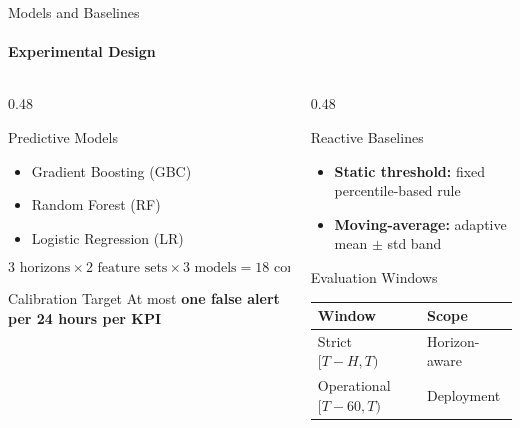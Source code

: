 \documentclass[aspectratio=169,11pt]{beamer}
\begin{document}
\begin{frame}{Models and Baselines}
\framesubtitle{Experimental Design}

\begin{columns}[T]
\begin{column}{0.48\textwidth}
\begin{block}{Predictive Models}
\begin{itemize}
    \item Gradient Boosting (GBC)
    \item Random Forest (RF)
    \item Logistic Regression (LR)
\end{itemize}
\end{block}

\vspace{0.4em}
{\small
\[
3 \text{ horizons} \times 2 \text{ feature sets} \times 3 \text{ models} = 18 \text{ configs}
\]
}

\begin{alertblock}{Calibration Target}
At most \textbf{one false alert per 24 hours per KPI}
\end{alertblock}
\end{column}

\begin{column}{0.48\textwidth}
\begin{block}{Reactive Baselines}
\begin{itemize}
    \item \textbf{Static threshold:} fixed percentile-based rule
    \item \textbf{Moving-average:} adaptive mean $\pm$ std band
\end{itemize}
\end{block}

\vspace{0.4em}
\begin{block}{Evaluation Windows}
{\small
\begin{tabular}{ll}
\toprule
\textbf{Window} & \textbf{Scope} \\
\midrule
Strict $[T{-}H, T)$ & Horizon-aware \\
Operational $[T{-}60, T)$ & Deployment \\
\bottomrule
\end{tabular}
}
\end{block}
\end{column}
\end{columns}
\end{frame}
\end{document}
